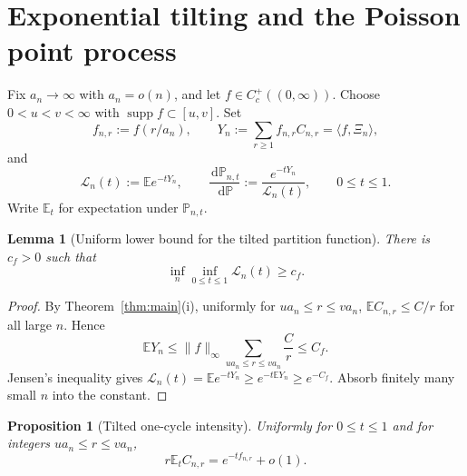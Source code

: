 \documentclass[11pt]{article}
\newcommand{\E}{\mathbb E}
\newcommand{\Pp}{\mathbb P}
\newcommand{\1}{\mathbf 1}
\newcommand{\supp}{\operatorname{supp}}
\newcommand{\cL}{\mathcal L}
\newcommand{\dd}{\,\mathrm d}
\newtheorem{proposition}[theorem]{Proposition}
\newtheorem{lemma}[theorem]{Lemma}
\theoremstyle{definition}
\theoremstyle{remark}
\begin{document}
\section{Exponential tilting and the Poisson point process}
\label{sec:tilting}

Fix $a_n\to\infty$ with $a_n=o(n)$, and let
$f\in C_c^+((0,\infty))$.  Choose $0<u<v<\infty$ with
$\supp f\subset[u,v]$.  Set
\begin{equation}\label{eq:f-n-r}
  f_{n,r}:=f(r/a_n),
  \qquad
  Y_n:=\sum_{r\geq1}f_{n,r}C_{n,r}
      =\langle f,\Xi_n\rangle,
\end{equation}
and
\begin{equation}\label{eq:Laplace-tilt}
  \cL_n(t):=\E e^{-tY_n},
  \qquad
  \frac{\dd\Pp_{n,t}}{\dd\Pp}
  :=\frac{e^{-tY_n}}{\cL_n(t)},
  \qquad 0\leq t\leq1.
\end{equation}
Write $\E_t$ for expectation under $\Pp_{n,t}$.

\begin{lemma}[Uniform lower bound for the tilted partition function]
\label{lem:partition-lower}
There is $c_f>0$ such that
\begin{equation}\label{eq:partition-lower}
  \inf_n\inf_{0\leq t\leq1}\cL_n(t)\geq c_f.
\end{equation}
\end{lemma}

\begin{proof}
By Theorem~\ref{thm:main}(i), uniformly for
$ua_n\leq r\leq va_n$,
$\E C_{n,r}\leq C/r$ for all large $n$.  Hence
\[
  \E Y_n
  \leq \|f\|_\infty
       \sum_{ua_n\leq r\leq va_n}\frac Cr
  \leq C_f.
\]
Jensen's inequality gives
$\cL_n(t)=\E e^{-tY_n}\geq e^{-t\E Y_n}\geq e^{-C_f}$.
Absorb finitely many small $n$ into the constant.
\end{proof}

\begin{proposition}[Tilted one-cycle intensity]
\label{prop:tilted-intensity}
Uniformly for $0\leq t\leq1$ and for integers
$ua_n\leq r\leq va_n$,
\begin{equation}\label{eq:tilted-intensity}
  r\E_t C_{n,r}=e^{-tf_{n,r}}+o(1).
\end{equation}
\end{proposition}
\end{document}
